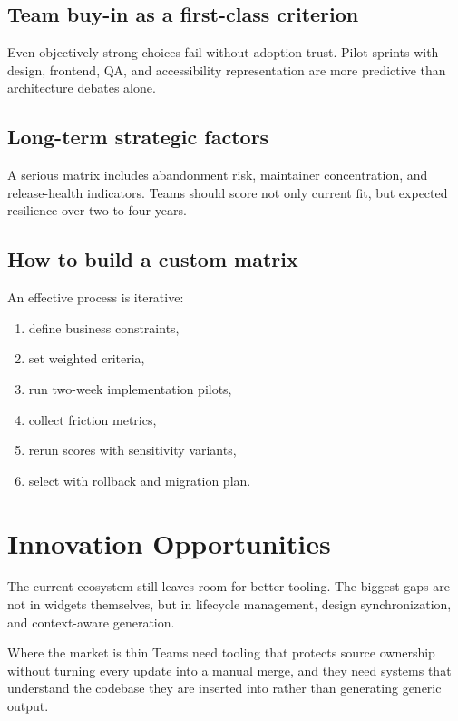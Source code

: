 \documentclass[11pt,twoside,a4paper]{article}
\begin{document}
\subsection{Team buy-in as a first-class criterion}
Even objectively strong choices fail without adoption trust. Pilot sprints with design, frontend, QA, and accessibility representation are more predictive than architecture debates alone.

\subsection{Long-term strategic factors}
A serious matrix includes abandonment risk, maintainer concentration, and release-health indicators. Teams should score not only current fit, but expected resilience over two to four years.

\subsection{How to build a custom matrix}
An effective process is iterative:

\begin{enumerate}[leftmargin=*, itemsep=0.3em]
  \item define business constraints,
  \item set weighted criteria,
  \item run two-week implementation pilots,
  \item collect friction metrics,
  \item rerun scores with sensitivity variants,
  \item select with rollback and migration plan.
\end{enumerate}

\section{Innovation Opportunities}
The current ecosystem still leaves room for better tooling. The biggest gaps are not in widgets themselves, but in lifecycle management, design synchronization, and context-aware generation.

\begin{highlightbox}{Where the market is thin}
Teams need tooling that protects source ownership without turning every update into a manual merge, and they need systems that understand the codebase they are inserted into rather than generating generic output.
\end{highlightbox}
\end{document}

